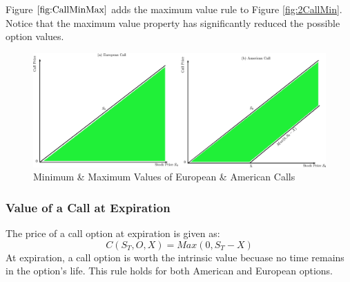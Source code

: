 \documentclass{book}
\theoremstyle{definition}
\theoremstyle{remark}
\begin{document}
            Figure $\ref{fig:CallMinMax}$ adds the maximum value rule to Figure \ref{fig:2CallMin}. Notice that the maximum value property has significantly reduced the possible option values. 
            
                \begin{figure}[h]
                    \centering
                        \includegraphics[scale=0.45]{images/fig:CallMinMax.eps}
                    \caption{Minimum \& Maximum Values of European \& American Calls}
                    \label{fig:CallMinMax}                
                \end{figure}
            
        \subsubsection{Value of a Call at Expiration}
            The price of a call option at expiration is given as:
                \begin{equation}
                    C(S_T, O, X) = Max(0, S_T - X)
                \end{equation}
            At expiration, a call option is worth the intrinsic value becuase no time remains in the option's life. This rule holds for both American and European options.
            
\end{document}
